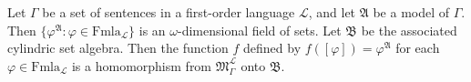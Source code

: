 Let $\Gamma$ be a set of sentences in a first-order language $\mathcal{L}$, and let $\mathfrak{A}$ be a model of $\Gamma$. Then $\{\varphi^{\mathfrak{A}} : \varphi \in \mathrm{Fmla}_{\mathcal{L}}\}$ is an $\omega$-dimensional field of sets. Let $\mathfrak{B}$ be the associated cylindric set algebra. Then the function $f$ defined by $f([\varphi]) = \varphi^{\mathfrak{A}}$ for each $\varphi \in \mathrm{Fmla}_{\mathcal{L}}$ is a homomorphism from $\mathfrak{M}_{\Gamma}^{\mathcal{L}}$ onto $\mathfrak{B}$.
